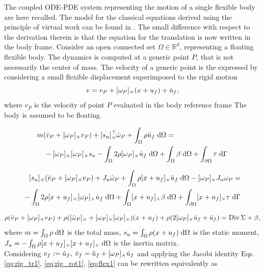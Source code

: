 The coupled ODE-PDE system representing the motion of a single flexible body are here recalled. The model for the classical equations derived using the principle of virtual work can be found in \cite{MB_Daepde}. The small difference with respect to the derivation therein is that the equation for the translation is now written in the body frame. Consider an open connected set $\Omega \in \mathbb{R}^d$, representing a floating flexible body. The dynamics is computed at a generic point $P$, that is not necessarily the center of mass. The velocity of a generic point is the expressed by considering a small flexible displacement superimposed to the rigid motion
\[
v = v_P + [\omega_P]_{\times} (x+u_f) + \dot{u}_f,
\]
where $v_P$ is the velocity of point $P$ evaluated in the body reference frame
 The body is assumed to be floating. 

\begin{equation}
\label{eq:rig_tr1}
\begin{split}
&m (\dot{{v}}_P + \crmat{\omega_P}v_P) + \crmat{s_u}^\top \dot{{\omega}}_P  + \int_{\Omega} \rho \ddot{u}_f \d{\Omega} = \\
&\quad - \crmat{\omega_P} \crmat{\omega_P} {s}_u - \int_{\Omega} 2 \rho \crmat{\omega_P} \dot{u}_f \d{\Omega} +  \int_{\Omega} \beta \d{\Omega} + \int_{\partial \Omega} \tau \d{\Gamma} 
\end{split}
\end{equation}

\begin{equation}
\label{eq:rig_rot1}
\begin{split}
\crmat{s_u} (\dot{{v}}_P + \crmat{\omega_P} v_P) + J_u \dot{\omega}_P + \int_{\Omega} \rho \crmat{x+u_f} \ddot{u}_f \d{\Omega} - \crmat{\omega_P} J_u \omega_P = \\ 
- \int_{\Omega} 2\rho \crmat{x+u_f} \crmat{\omega_P} \dot{u}_f \d{\Omega} + \int_{\Omega}\crmat{x+u_f} \beta \d{\Omega} + \int_{\partial \Omega}\crmat{x+u_f} \tau \d{\Gamma} \\
\end{split}
\end{equation}

\begin{equation}
\label{eq:flex1}
\rho (\dot{{v}}_P + [\omega_P]_{\times} v_P) + \rho ([\dot{\omega}_P]_{\times} + [\omega_P]_{\times}[\omega_P]_{\times})(x + u_f) + \rho (2 [\omega_P]_{\times} \dot{u}_f + \ddot{u}_f) = \operatorname*{Div}{\Sigma} + \beta,
\end{equation}
where $m = \int_{\Omega} \rho \d{\Omega}$ is the total mass,  $s_u = \int_{\Omega} \rho (x + u_f) \d{\Omega}$ is the static moment, $J_u= - \int_{\Omega} \rho \crmat{x+u_f}\crmat{x+u_f} \d{\Omega}$ is the inertia matrix. \\
Considering $v_f := \dot{u}_f, \; \dot{v}_f = \ddot{u}_f + [\omega_P]_{\times} \dot{u}_f$ and applying the Jacobi identity Eqs. \eqref{eq:rig_tr1}, \eqref{eq:rig_rot1}, \eqref{eq:flex1} can be rewritten equivalently as \\

